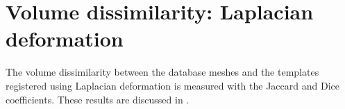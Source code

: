 



\newpage
\section{Volume dissimilarity: Laplacian deformation}
\label{appendix:volume_laplacian2database}


The volume dissimilarity between the database meshes \mr* and the templates registered using Laplacian deformation \ml* is measured with the Jaccard and Dice coefficients. These results are discussed in . 



